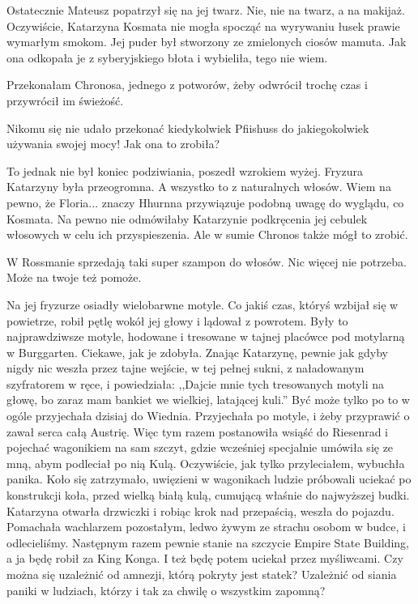 Ostatecznie Mateusz popatrzył się na jej twarz.
Nie, nie na twarz, a na makijaż.
Oczywiście, Katarzyna Kosmata nie mogła spocząć na wyrywaniu łusek prawie wymarłym smokom.
Jej puder był stworzony ze zmielonych ciosów mamuta.
Jak ona odkopała je z syberyjskiego błota i wybieliła, tego nie wiem.
\begin{dialogue}
\ds{} Przekonałam Chronosa, jednego z potworów, żeby odwrócił trochę czas i przywrócił im świeżość.
\end{dialogue}

Nikomu się nie udało przekonać kiedykolwiek Pfiishuss do jakiegokolwiek używania swojej mocy! Jak ona to zrobiła?

To jednak nie był koniec podziwiania, poszedł wzrokiem wyżej.
Fryzura Katarzyny była przeogromna. A wszystko to z naturalnych włosów. Wiem na pewno, że Floria... znaczy Hhurnna przywiązuje podobną uwagę do wyglądu, co Kosmata. Na pewno nie odmówiłaby Katarzynie podkręcenia jej cebulek włosowych w celu ich przyspieszenia. Ale w sumie Chronos także mógł to zrobić.
\begin{dialogue}
\ds{} W Rossmanie sprzedają taki super szampon do włosów. Nic więcej nie potrzeba. Może na twoje też pomoże. 
\end{dialogue}

Na jej fryzurze osiadły wielobarwne motyle. Co jakiś czas, któryś wzbijał się w powietrze, robił pętlę wokół jej głowy i lądował z powrotem.
Były to najprawdziwsze motyle, hodowane i tresowane w tajnej placówce pod motylarną w Burggarten.
Ciekawe, jak je zdobyła. Znając Katarzynę, pewnie jak gdyby nigdy nic weszła przez tajne wejście, w tej pełnej sukni, z naładowanym szyfratorem w ręce, i powiedziała:
,,Dajcie mnie tych tresowanych motyli na głowę, bo zaraz mam bankiet we wielkiej, latającej kuli.''
Być może tylko po to w ogóle przyjechała dzisiaj do Wiednia.
Przyjechała po motyle, i żeby przyprawić o zawał serca całą Austrię.
Więc tym razem postanowiła wsiąść do Riesenrad i pojechać wagonikiem na sam szczyt, gdzie wcześniej specjalnie umówiła się ze mną, abym podleciał po nią Kulą.
Oczywiście, jak tylko przyleciałem, wybuchła panika. Koło się zatrzymało, uwięzieni w wagonikach ludzie próbowali uciekać po konstrukcji koła, 
przed wielką białą kulą, cumującą właśnie do najwyższej budki. Katarzyna otwarła drzwiczki i robiąc krok nad przepaścią, weszła do pojazdu.
Pomachała wachlarzem pozostałym, ledwo żywym ze strachu osobom w budce, i odlecieliśmy.
Następnym razem pewnie stanie na szczycie Empire State Building, a ja będę robił za King Konga.
I też będę potem uciekał przez myśliwcami.
Czy można się uzależnić od amnezji, którą pokryty jest statek?
Uzależnić od siania paniki w ludziach, którzy i tak za chwilę o wszystkim zapomną?

